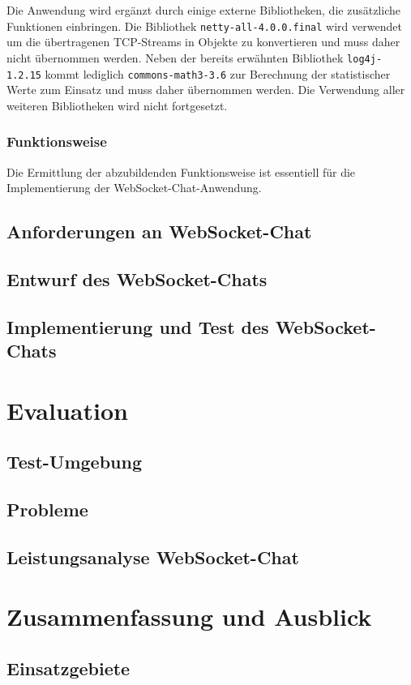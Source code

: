 \documentclass[11pt,a4paper,titlepage]{scrartcl}
\numberwithin{equation}{section}
\begin{document}
\noindent Die Anwendung wird ergänzt durch einige externe Bibliotheken, die zusätzliche Funktionen einbringen. Die Bibliothek \texttt{netty-all-4.0.0.final} wird verwendet um die übertragenen TCP-Streams in Objekte zu konvertieren und muss daher nicht übernommen werden. Neben der bereits erwähnten Bibliothek \texttt{log4j-1.2.15} kommt lediglich \texttt{commons-math3-3.6} zur Berechnung der statistischer Werte zum Einsatz und muss daher übernommen werden. Die Verwendung aller weiteren Bibliotheken wird nicht fortgesetzt.

\subsubsection{Funktionsweise}
Die Ermittlung der abzubildenden Funktionsweise ist essentiell für die Implementierung der WebSocket-Chat-Anwendung. 

\subsection{Anforderungen an WebSocket-Chat}
\subsection{Entwurf des WebSocket-Chats}
\subsection{Implementierung und Test des WebSocket-Chats}

\section{Evaluation}
\subsection{Test-Umgebung}
\subsection{Probleme}
\subsection{Leistungsanalyse WebSocket-Chat}

\section{Zusammenfassung und Ausblick}
\subsection{Einsatzgebiete}

\newpage
{}
\printbibliography
\newpage
\listoffigures
\newpage
\listoftables
\newpage
\lstlistoflistings
\end{document}
